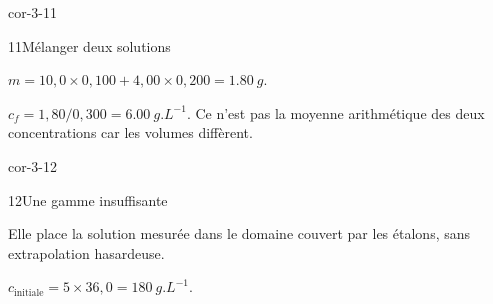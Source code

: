 \begin{blocLivre}{cor-3-11}\begin{corrige}{11}{Mélanger deux solutions}
\begin{questions}
\item $m=10,0\times0,100+4,00\times0,200=\qty{1,80}{g}$.
\item $c_f=1,80/0,300=\qty{6,00}{g.L^{-1}}$. Ce n’est pas la moyenne arithmétique des deux concentrations car les volumes diffèrent.
\end{questions}
\end{corrige}\end{blocLivre}
\begin{blocLivre}{cor-3-12}\begin{corrige}{12}{Une gamme insuffisante}
\begin{questions}
\item Elle place la solution mesurée dans le domaine couvert par les étalons, sans extrapolation hasardeuse.
\item $c_{\mathrm{initiale}}=5\times36,0=\qty{180}{g.L^{-1}}$.
\end{questions}
\end{corrige}\end{blocLivre}

